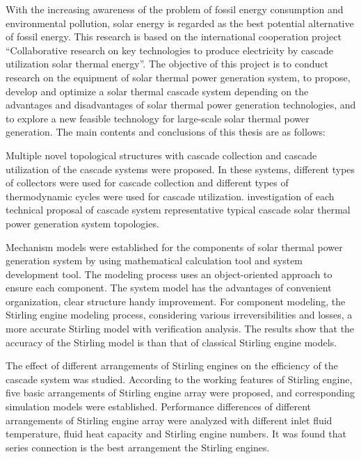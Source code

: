 \enabstract
{
With the increasing awareness of the problem of fossil energy consumption and environmental pollution, solar energy is regarded as the best potential alternative of fossil energy. This research is based on the international cooperation project ``Collaborative research on key technologies to produce electricity by cascade utilization solar thermal energy''. The objective of this project is to conduct research on the equipment of solar thermal power generation system, to propose, develop and optimize a solar thermal cascade system depending on the advantages and disadvantages of solar thermal power generation technologies, and to explore a new feasible technology for large-scale solar thermal power generation. The main contents and conclusions of this thesis are as follows:

Multiple novel topological structures with cascade collection and cascade utilization of the cascade systems were proposed. In these systems, different types of collectors were used for cascade collection and different types of thermodynamic cycles were used for cascade utilization.  investigation of each technical proposal of cascade system representative typical cascade solar thermal power generation system topologies.

Mechanism models were established for the components of solar thermal power generation system by using mathematical calculation tool and system development tool. The modeling process uses an object-oriented approach to ensure  each component. The system model has the advantages of convenient organization, clear structure handy improvement. For component modeling, the Stirling engine modeling process, considering various irreversibilities and losses,  a more accurate Stirling model with verification analysis. The results show that the accuracy of the  Stirling model is  than that of classical Stirling engine models.

The effect of different arrangements of Stirling engines on the efficiency of the cascade system was studied. 
According to the working features of Stirling engine, five basic arrangements of Stirling engine array were proposed, and corresponding simulation models were established.
Performance differences of different arrangements of Stirling engine array were analyzed with different inlet fluid temperature, fluid heat capacity and Stirling engine numbers.
It was found that series connection is the best arrangement  the Stirling engines.

}

